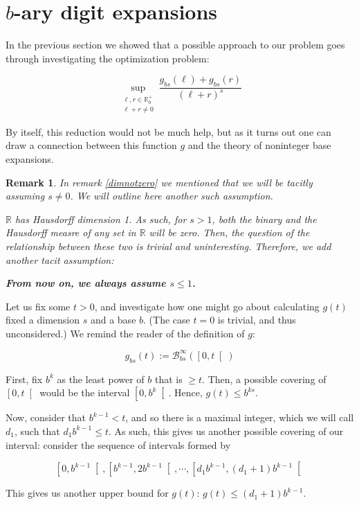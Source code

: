 \documentclass[11pt]{amsart}
\newcommand{\R}{\mathbb{R}}
\newcommand{\BB}{\mathcal{B}}
\newtheorem{remark}{Remark}
\begin{document}
\section{$b$-ary digit expansions}

In the previous section we showed that a possible approach to our problem goes through investigating the optimization problem:

\[ \sup_{\substack{\ell,r \in \R^+_0\\\ell+r \neq 0}} \frac{g_{bs}(\ell) + g_{bs}(r)}{(\ell + r)^s} \]

By itself, this reduction would not be much help, but as it turns out one can draw a connection between this function $g$ and the theory of noninteger base expansions.

\begin{remark}
In remark \ref{dimnotzero} we mentioned that we will be tacitly assuming $s \neq 0$. We will outline here another such assumption.

$\R$ has Hausdorff dimension 1. As such, for $s > 1$, both the binary and the Hausdorff measre of \emph{any} set in $\R$ will be zero. Then, the question of the relationship between these two is trivial and uninteresting. Therefore, we add another tacit assumption:

\textbf{From now on, we always assume $s \leq 1$.}
\end{remark}

Let us fix some $t > 0$, and investigate how one might go about calculating $g(t)$ fixed a dimension $s$ and a base $b$. (The case $t = 0$ is trivial, and thus unconsidered.) We remind the reader of the definition of $g$:

\[g_{bs}(t) := \BB_{bs}^\infty(\left[0, t \right[)\]

First, fix $b^k$ as the least power of $b$ that is $\geq t$. Then, a possible covering of $\left[0, t \right[$ would be the interval $\left[0, b^k\right[$. Hence, $g(t) \leq b^{ks}$.

Now, consider that $b^{k-1} < t$, and so there is a maximal integer, which we will call $d_1$, such that $d_1 b^{k-1} \leq t$. As such, this gives us another possible covering of our interval: consider the sequence of intervals formed by

\[\left[0, b^{k-1} \right[, \left[b^{k-1}, 2 b^{k-1} \right[, \cdots, \left[d_1 b^{k-1}, (d_1 + 1) b^{k-1} \right[ \]

This gives us another upper bound for $g(t)$: $g(t) \leq (d_1 + 1) b^{k-1}$.
\end{document}
